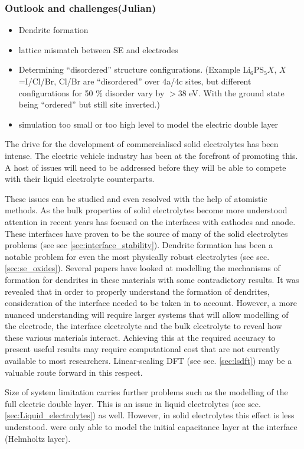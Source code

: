 \documentclass[../main.tex]{subfiles}
\begin{document}
\subsubsection{Outlook and challenges(Julian)}
\begin{itemize}
    \item Dendrite formation
    \item lattice mismatch between SE and electrodes
    \item Determining ``disordered'' structure configurations. (Example Li$_6$PS$_{5}X$, $X$=I/Cl/Br, Cl/Br are ``disordered'' over 4a/4c sites, but different configurations for 50 \% disorder vary by $>$38 eV. With the ground state being ``ordered'' but still site inverted.)
    \item simulation too small or too high level to model the electric double layer
\end{itemize}
The drive for the development of commercialised solid electrolytes has been intense. The electric vehicle industry has been at the forefront of promoting this.\cite{Woods_2021} A host of issues will need to be addressed before they will be able to compete with their liquid electrolyte counterparts. 

These issues can be studied and even resolved with the help of atomistic methods. As the bulk properties of solid electrolytes become more understood attention in recent years has focused on the interfaces with cathodes and anode. These interfaces have proven to be the source of many of the solid electrolytes problems (see sec \ref{sec:interface_stability}). 
Dendrite formation has been a notable problem for even the most physically robust electrolytes (see sec. \ref{sec:se_oxides}). Several papers have looked at modelling the mechanisms of formation for dendrites in these materials\cite{Tian2018, Gao2020, Canepa2018} with some contradictory results. It was revealed that in order to properly understand the formation of dendrites, consideration of the interface needed to be taken in to account. However, a more nuanced understanding will require larger systems that will allow modelling of the electrode, the interface electrolyte and the bulk electrolyte to reveal how these various materials interact. Achieving this at the required accuracy to present useful results may require computational cost that are not currently available to most researchers. Linear-scaling DFT (see sec. \ref{sec:lsdft}) may be a valuable route forward in this respect. 

Size of system limitation carries further problems such as the modelling of the full electric double layer. This is an issue in liquid electrolytes (see sec. \ref{sec:Liquid_electrolytes}) as well. However, in solid electrolytes this effect is less understood. \citeauthor{Tateyama2019} were only able to model the initial capacitance layer at the interface (Helmholtz layer).
\end{document}
